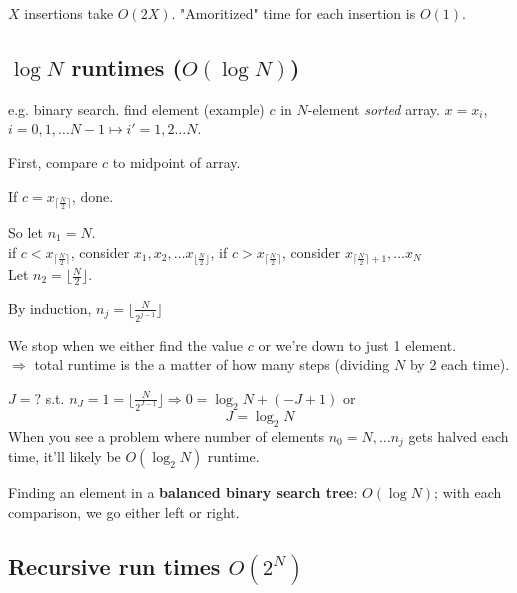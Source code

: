 \documentclass[10pt]{amsart}
\begin{document}
$X$ insertions take $O(2X)$.  "Amoritized" time for each insertion is $O(1)$.

\subsection{$\log{N}$ runtimes ($O(\log{N})$)} 

e.g. binary search. find element (example) $c$ in $N$-element \emph{sorted} array. $x= x_i$, $i=0,1, \dots N-1 \mapsto i' = 1, 2 \dots N$. 

First, compare $c$ to midpoint of array. 

If $c= x_{ \lceil \frac{N}{2} \rceil }$, done.

So let $n_1 =N$.  \\

if $c< x_{ \lceil \frac{N}{2} \rceil }$, consider $x_1, x_2, \dots x_{ \lfloor \frac{N}{2} \rfloor }$, if $c> x_{ \lceil \frac{N}{2} \rceil }$, consider $x_{ \lceil \frac{N}{2} \rceil + 1},  \dots x_N$ \\

Let $n_2= \lfloor \frac{N}{2} \rfloor$. 

By induction, $n_j = \lfloor \frac{N}{2^{j-1}} \rfloor$

We stop when we either find the value $c$ or we're down to just 1 element. \\
$\Longrightarrow $ total runtime is the a matter of how many steps (dividing $N$ by 2 each time).

$J = ?$ s.t. $n_J = 1 = \lfloor \frac{N}{2^{J-1}} \rfloor \Longrightarrow  0 = \log_2{N} + (-J + 1)$ or 
\[
J = \log_2{N}
\]
When you see a problem where number of elements $n_0 = N, \dots n_j$ gets halved each time, it'll likely be $O(\log_2{N})$ runtime. 

Finding an element in a \textbf{balanced binary search tree}: $O(\log{N})$; with each comparison, we go either left or right.

\subsection{Recursive run times $O(2^N)$}
\end{document}
